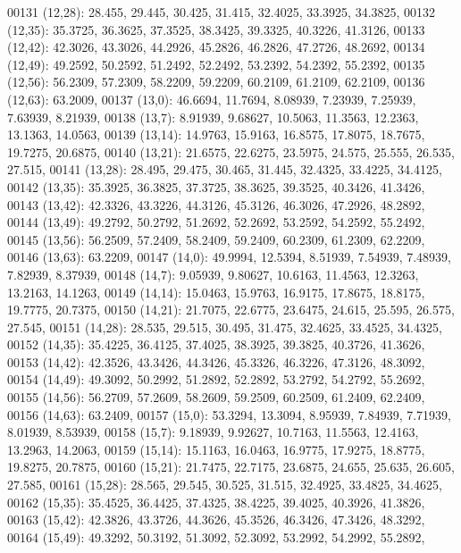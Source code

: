 \begin{DoxyCode}
00131       (12,28): 28.455, 29.445, 30.425, 31.415, 32.4025, 33.3925, 34.3825,
00132       (12,35): 35.3725, 36.3625, 37.3525, 38.3425, 39.3325, 40.3226, 41.3126,
00133       (12,42): 42.3026, 43.3026, 44.2926, 45.2826, 46.2826, 47.2726, 48.2692,
00134       (12,49): 49.2592, 50.2592, 51.2492, 52.2492, 53.2392, 54.2392, 55.2392,
00135       (12,56): 56.2309, 57.2309, 58.2209, 59.2209, 60.2109, 61.2109, 62.2109,
00136       (12,63): 63.2009,
00137       (13,0): 46.6694, 11.7694, 8.08939, 7.23939, 7.25939, 7.63939, 8.21939,
00138       (13,7): 8.91939, 9.68627, 10.5063, 11.3563, 12.2363, 13.1363, 14.0563,
00139       (13,14): 14.9763, 15.9163, 16.8575, 17.8075, 18.7675, 19.7275, 20.6875,
00140       (13,21): 21.6575, 22.6275, 23.5975, 24.575, 25.555, 26.535, 27.515,
00141       (13,28): 28.495, 29.475, 30.465, 31.445, 32.4325, 33.4225, 34.4125,
00142       (13,35): 35.3925, 36.3825, 37.3725, 38.3625, 39.3525, 40.3426, 41.3426,
00143       (13,42): 42.3326, 43.3226, 44.3126, 45.3126, 46.3026, 47.2926, 48.2892,
00144       (13,49): 49.2792, 50.2792, 51.2692, 52.2692, 53.2592, 54.2592, 55.2492,
00145       (13,56): 56.2509, 57.2409, 58.2409, 59.2409, 60.2309, 61.2309, 62.2209,
00146       (13,63): 63.2209,
00147       (14,0): 49.9994, 12.5394, 8.51939, 7.54939, 7.48939, 7.82939, 8.37939,
00148       (14,7): 9.05939, 9.80627, 10.6163, 11.4563, 12.3263, 13.2163, 14.1263,
00149       (14,14): 15.0463, 15.9763, 16.9175, 17.8675, 18.8175, 19.7775, 20.7375,
00150       (14,21): 21.7075, 22.6775, 23.6475, 24.615, 25.595, 26.575, 27.545,
00151       (14,28): 28.535, 29.515, 30.495, 31.475, 32.4625, 33.4525, 34.4325,
00152       (14,35): 35.4225, 36.4125, 37.4025, 38.3925, 39.3825, 40.3726, 41.3626,
00153       (14,42): 42.3526, 43.3426, 44.3426, 45.3326, 46.3226, 47.3126, 48.3092,
00154       (14,49): 49.3092, 50.2992, 51.2892, 52.2892, 53.2792, 54.2792, 55.2692,
00155       (14,56): 56.2709, 57.2609, 58.2609, 59.2509, 60.2509, 61.2409, 62.2409,
00156       (14,63): 63.2409,
00157       (15,0): 53.3294, 13.3094, 8.95939, 7.84939, 7.71939, 8.01939, 8.53939,
00158       (15,7): 9.18939, 9.92627, 10.7163, 11.5563, 12.4163, 13.2963, 14.2063,
00159       (15,14): 15.1163, 16.0463, 16.9775, 17.9275, 18.8775, 19.8275, 20.7875,
00160       (15,21): 21.7475, 22.7175, 23.6875, 24.655, 25.635, 26.605, 27.585,
00161       (15,28): 28.565, 29.545, 30.525, 31.515, 32.4925, 33.4825, 34.4625,
00162       (15,35): 35.4525, 36.4425, 37.4325, 38.4225, 39.4025, 40.3926, 41.3826,
00163       (15,42): 42.3826, 43.3726, 44.3626, 45.3526, 46.3426, 47.3426, 48.3292,
00164       (15,49): 49.3292, 50.3192, 51.3092, 52.3092, 53.2992, 54.2992, 55.2892,

\end{DoxyCode}
